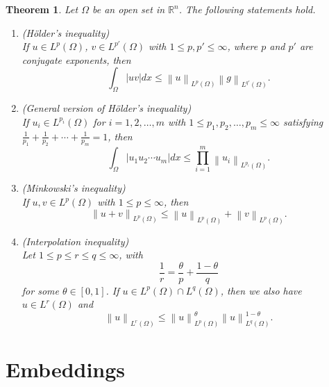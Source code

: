 \documentclass[11pt,a4paper]{report}
\newtheorem{theorem}{Theorem}[section]
\theoremstyle{definition}
\begin{document}
\begin{theorem}
	Let $\Omega$ be an open set in $\mathbb{R}^{n}$.
	The following statements hold.
	\begin{enumerate}[label=(\alph*)] 
		\rm\item (H\"{o}lder's inequality) \\[0.1cm]
		If $u \in L^p(\Omega)$, $v \in L^{p'}(\Omega)$ with $1 \leq p, p' \leq \infty$, where $p$ and $p'$ are conjugate exponents, then 
		\begin{equation*} 
			\int_{\Omega} |uv|dx \leq \left\| u \right\|_{L^p(\Omega)} \left\| g \right\|_{L^{q'}(\Omega)}.
		\end{equation*}
		\rm\item (General version of H\"{o}lder's inequality) \\[0.1cm]
		If $u_i \in L^{p_i}(\Omega)$ for $i = 1, 2, \ldots, m$ with $1 \leq p_1, p_2, \ldots, p_m \leq \infty$ satisfying $\frac{1}{p_1} + \frac{1}{p_2} + \cdots + \frac{1}{p_m} = 1$, then 
		\begin{equation*} 
			\int_{\Omega} |u_1 u_2 \cdots u_m |dx \leq \prod_{i=1}^m \left\| u_i \right\|_{L^{p_i}(\Omega)}.
		\end{equation*}
		\rm\item (Minkowski's inequality)\\[0.1cm]
		If $u, v \in L^p(\Omega)$ with $1 \leq p  \leq \infty$, then 
		\begin{equation*} 
			\left\| u + v\right\|_{L^p(\Omega)} \leq \left\| u \right\|_{L^p(\Omega)} + \left\| v \right\|_{L^p(\Omega)}.
		\end{equation*}
		\rm\item (Interpolation inequality)\\[0.1cm]
		Let $1 \leq p \leq r \leq q \leq \infty$, with 
		\begin{equation*} 
			\frac{1}{r} = \frac{\theta}{p} + \frac{1 - \theta}{q}
		\end{equation*}
		for some $\theta \in [0, 1]$.
		If $u \in L^p(\Omega) \cap L^q(\Omega)$, then we also have $u \in L^r(\Omega)$ and 
		\begin{equation*} 
			\left\| u \right\|_{L^r(\Omega)} \leq \left\| u \right\|^{\theta}_{L^p(\Omega)} \left\| u \right\|^{1 - \theta}_{L^q(\Omega)}.
		\end{equation*}
	\end{enumerate}
\end{theorem}


\chapter{Embeddings}
\end{document}
